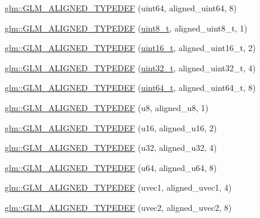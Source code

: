 \begin{DoxyCompactItemize}
\item 
\hyperlink{group__gtx__type__aligned_ga3328061a64c20ba59d5f9da24c2cd059}{glm\+::\+G\+L\+M\+\_\+\+A\+L\+I\+G\+N\+E\+D\+\_\+\+T\+Y\+P\+E\+D\+E\+F} (uint64, aligned\+\_\+uint64, 8)
\item 
\hyperlink{group__gtx__type__aligned_gaf6ced36f13bae57f377bafa6f5fcc299}{glm\+::\+G\+L\+M\+\_\+\+A\+L\+I\+G\+N\+E\+D\+\_\+\+T\+Y\+P\+E\+D\+E\+F} (\hyperlink{simddefines_8h_aba7bc1797add20fe3efdf37ced1182c5}{uint8\+\_\+t}, aligned\+\_\+uint8\+\_\+t, 1)
\item 
\hyperlink{group__gtx__type__aligned_gafbc7fb7847bfc78a339d1d371c915c73}{glm\+::\+G\+L\+M\+\_\+\+A\+L\+I\+G\+N\+E\+D\+\_\+\+T\+Y\+P\+E\+D\+E\+F} (\hyperlink{simddefines_8h_adf4d876453337156dde61095e1f20223}{uint16\+\_\+t}, aligned\+\_\+uint16\+\_\+t, 2)
\item 
\hyperlink{group__gtx__type__aligned_gaa86bc56a73fd8120b1121b5f5e6245ae}{glm\+::\+G\+L\+M\+\_\+\+A\+L\+I\+G\+N\+E\+D\+\_\+\+T\+Y\+P\+E\+D\+E\+F} (\hyperlink{simddefines_8h_a435d1572bf3f880d55459d9805097f62}{uint32\+\_\+t}, aligned\+\_\+uint32\+\_\+t, 4)
\item 
\hyperlink{group__gtx__type__aligned_ga68c0b9e669060d0eb5ab8c3ddeb483d8}{glm\+::\+G\+L\+M\+\_\+\+A\+L\+I\+G\+N\+E\+D\+\_\+\+T\+Y\+P\+E\+D\+E\+F} (\hyperlink{simddefines_8h_aaa5d1cd013383c889537491c3cfd9aad}{uint64\+\_\+t}, aligned\+\_\+uint64\+\_\+t, 8)
\item 
\hyperlink{group__gtx__type__aligned_ga4f3bab577daf3343e99cc005134bce86}{glm\+::\+G\+L\+M\+\_\+\+A\+L\+I\+G\+N\+E\+D\+\_\+\+T\+Y\+P\+E\+D\+E\+F} (u8, aligned\+\_\+u8, 1)
\item 
\hyperlink{group__gtx__type__aligned_ga13a2391339d0790d43b76d00a7611c4f}{glm\+::\+G\+L\+M\+\_\+\+A\+L\+I\+G\+N\+E\+D\+\_\+\+T\+Y\+P\+E\+D\+E\+F} (u16, aligned\+\_\+u16, 2)
\item 
\hyperlink{group__gtx__type__aligned_ga197570e03acbc3d18ab698e342971e8f}{glm\+::\+G\+L\+M\+\_\+\+A\+L\+I\+G\+N\+E\+D\+\_\+\+T\+Y\+P\+E\+D\+E\+F} (u32, aligned\+\_\+u32, 4)
\item 
\hyperlink{group__gtx__type__aligned_ga0f033b21e145a1faa32c62ede5878993}{glm\+::\+G\+L\+M\+\_\+\+A\+L\+I\+G\+N\+E\+D\+\_\+\+T\+Y\+P\+E\+D\+E\+F} (u64, aligned\+\_\+u64, 8)
\item 
\hyperlink{group__gtx__type__aligned_ga509af83527f5cd512e9a7873590663aa}{glm\+::\+G\+L\+M\+\_\+\+A\+L\+I\+G\+N\+E\+D\+\_\+\+T\+Y\+P\+E\+D\+E\+F} (uvec1, aligned\+\_\+uvec1, 4)
\item 
\hyperlink{group__gtx__type__aligned_ga94e86186978c502c6dc0c0d9c4a30679}{glm\+::\+G\+L\+M\+\_\+\+A\+L\+I\+G\+N\+E\+D\+\_\+\+T\+Y\+P\+E\+D\+E\+F} (uvec2, aligned\+\_\+uvec2, 8)

\end{DoxyCompactItemize}

